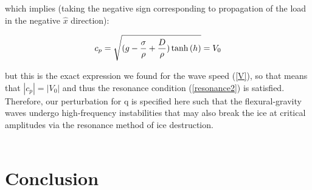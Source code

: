 \documentclass{article}
\begin{document}
which implies (taking the negative sign corresponding to propagation of the load in the negative \(\hat{x}\) direction):

\begin{equation} \label{cp2}
  c_{p} = \sqrt{(g - \frac{\sigma }{\rho} + \frac{D }{\rho})\tanh{(h)}} = V_{0}
\\
\end{equation} 

but this is the exact expression we found for the wave speed (\ref{V}), so that means that \(|c_{p}| = |V_0|\) and thus the resonance condition (\ref{resonance2}) is satisfied. Therefore, our perturbation for q is specified here such that the flexural-gravity waves undergo high-frequency instabilities that may also break the ice at critical amplitudes via the resonance method of ice destruction.
\\
\\


\section{Conclusion}
\end{document}
